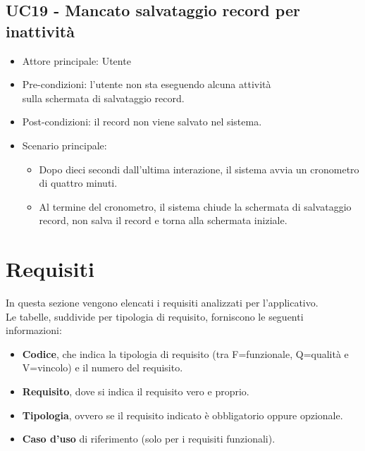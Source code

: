 \subsection{UC19 - Mancato salvataggio record per inattività}
\begin{itemize}
    \item Attore principale: Utente
    \item Pre-condizioni: l'utente non sta eseguendo alcuna attività \\ sulla schermata di salvataggio record.
    \item Post-condizioni: il record non viene salvato nel sistema.
    \item Scenario principale: \begin{itemize}
        \item Dopo dieci secondi dall'ultima interazione, il sistema avvia un cronometro di quattro minuti.
        \item Al termine del cronometro, il sistema chiude la schermata di salvataggio record, non salva il record e torna alla schermata iniziale.
    \end{itemize}
\end{itemize}
\newpage
\section{Requisiti}
In questa sezione vengono elencati i requisiti analizzati per l'applicativo.\\
Le tabelle, suddivide per tipologia di requisito, forniscono le seguenti informazioni:
\begin{itemize}
    \item \textbf{Codice}, che indica la tipologia di requisito (tra F=funzionale, Q=qualità e V=vincolo) e il numero del requisito.
    \item \textbf{Requisito}, dove si indica il requisito vero e proprio.
    \item \textbf{Tipologia}, ovvero se il requisito indicato è obbligatorio oppure opzionale.
    \item \textbf{Caso d'uso} di riferimento (solo per i requisiti funzionali).
\end{itemize}
